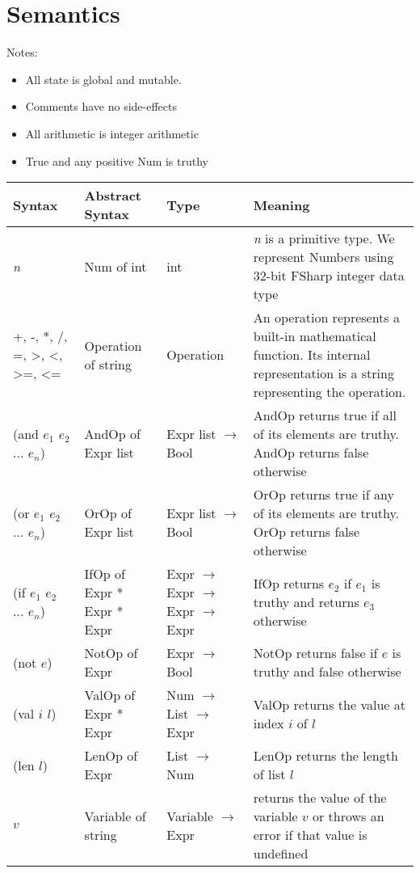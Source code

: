 \documentclass{article}
\begin{document}
\section{Semantics}

Notes:
\begin{itemize}
\item  All state is global and mutable.
\item Comments have no side-effects
\item All arithmetic is integer arithmetic
\item True and any positive Num is truthy
\end{itemize}

\begin{longtable}{|p{}|p{}|p{}|p{}|}
\hline
\textbf{Syntax} & \textbf{Abstract Syntax} & \textbf{Type} & \textbf{Meaning} \\
\hline\hline
\textit{n} & Num of int & int  & \textit{n} is a primitive type. We represent Numbers using 32-bit FSharp integer data type \\
\hline
+, -, *, /, =, >, <, >=, <= & Operation of string & Operation  & An operation represents a built-in mathematical function. Its internal representation is a string representing the operation. \\
\hline
(and $e_{1}$ $e_{2}$ ... $e_{n}$) & AndOp of Expr list & Expr list $\rightarrow$ Bool  & AndOp returns true if all of its elements are truthy. AndOp returns false otherwise \\
\hline
(or $e_{1}$ $e_{2}$ ... $e_{n}$) & OrOp of Expr list & Expr list $\rightarrow$ Bool  & OrOp returns true if any of its elements are truthy. OrOp returns false otherwise \\
\hline
(if $e_{1}$ $e_{2}$ ... $e_{n}$) & IfOp of Expr * Expr * Expr & Expr $\rightarrow$ Expr $\rightarrow$ Expr $\rightarrow$ Expr & IfOp returns $e_{2}$ if $e_{1}$ is truthy and returns $e_{3}$ otherwise \\
\hline
(not $e$) & NotOp of Expr & Expr $\rightarrow$ Bool & NotOp returns false if $e$ is truthy and false otherwise \\
\hline
(val $i$ $l$) & ValOp of Expr * Expr & Num $\rightarrow$ List $\rightarrow$ Expr & ValOp returns the value at index $i$ of $l$ \\
\hline
(len $l$) & LenOp of Expr & List $\rightarrow$ Num & LenOp returns the length of list $l$ \\
\hline
$v$ & Variable of string & Variable $\rightarrow$ Expr &  returns the value of the variable $v$ or throws an error if that value is undefined \\

\end{longtable}
\end{document}
